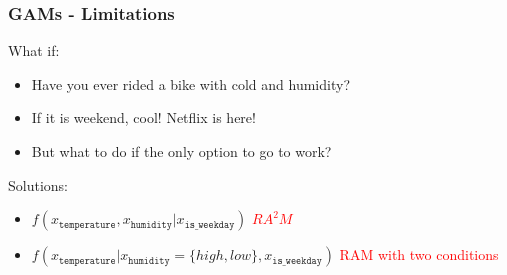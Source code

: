 \documentclass{beamer}
\begin{document}
\begin{frame}
  \frametitle{GAMs - Limitations}

  What if:
  \begin{itemize}
  \item<1-> Have you ever rided a bike with cold and humidity?
  \item<2-> If it is weekend, cool! Netflix is here!
  \item<3-> But what to do if the only option to go to work?
  \end{itemize}

  \noindent\makebox[\linewidth]{\rule{\paperwidth}{0.4pt}}

  Solutions:

  \begin{itemize}
  \item<4-> \(f(x_{\mathtt{temperature}}, x_{\mathtt{humidity}} | x_{\mathtt{is\_weekday}})\) \textcolor{red}{\(RA^2M\)}
    \item<5-> \(f(x_{\mathtt{temperature}}| x_{\mathtt{humidity}} = \{high, low\}, x_{\mathtt{is\_weekday}})\) \textcolor{red}{RAM with two conditions}
  \end{itemize}

\end{frame}
\end{document}
